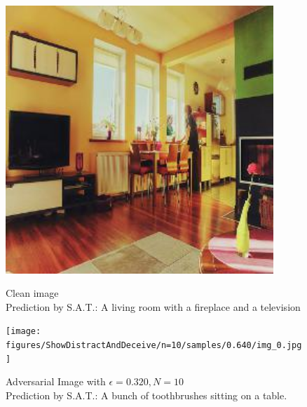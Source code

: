\begin{figure}[ht]
    \centering
    \begin{minipage}{0.45\textwidth}
        \centering
        \includegraphics[width=0.9\textwidth]{figures/ShowDistractAndDeceive/n=10/samples/0.000/img_0.jpg} %
        \caption*{Clean image\\Prediction by S.A.T.: A living room with a fireplace and a television}
    \end{minipage}\hfill
    \begin{minipage}{0.45\textwidth}
        \centering
        \texttt{[image: figures/ShowDistractAndDeceive/n=10/samples/0.640/img\_0.jpg]} %
        \caption*{Adversarial Image with $\epsilon=0.320, N=10$\\Prediction by S.A.T.: A bunch of toothbrushes sitting on a table.}
    \end{minipage}
\end{figure}